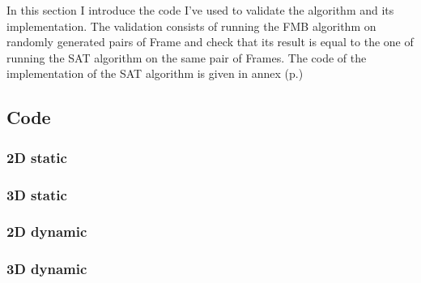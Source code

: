 \documentclass[12pt, a4paper]{article}
\begin{document}
In this section I introduce the code I've used to validate the algorithm and its implementation. The validation consists of running the FMB algorithm on randomly generated pairs of Frame and check that its result is equal to the one of running the SAT algorithm on the same pair of Frames. The code of the implementation of the SAT algorithm is given in annex (p.\pageref{sat_implementation})\\

\subsection{Code}

\subsubsection{2D static}

\begin{scriptsize}
\begin{ttfamily}

\end{ttfamily}
\end{scriptsize}

\subsubsection{3D static}

\begin{scriptsize}
\begin{ttfamily}

\end{ttfamily}
\end{scriptsize}

\subsubsection{2D dynamic}

\begin{scriptsize}
\begin{ttfamily}

\end{ttfamily}
\end{scriptsize}

\subsubsection{3D dynamic}
\end{document}
